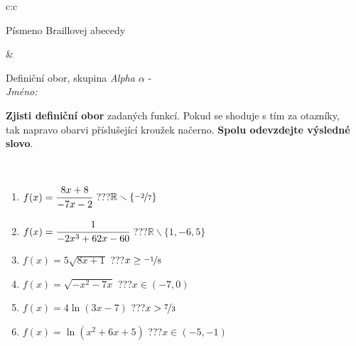 \documentclass[10pt]{report}
\begin{document}
\begin{tabular}{c:c}
\begin{minipage}[c][104.5mm][t]{0.5\linewidth}
\begin{center}
\begin{minipage}{0.20\linewidth}
\begin{center}
{\small Písmeno Braillovej abecedy}
\end{center}
\end{minipage}
\end{center}
\end{minipage}
&
\begin{minipage}[c][104.5mm][t]{0.5\linewidth}
\begin{center}
\vspace{7mm}
{\huge Definiční obor, skupina \textit{Alpha $\alpha$} -}\\[5mm]
\textit{Jméno:}\phantom{xxxxxxxxxxxxxxxxxxxxxxxxxxxxxxxxxxxxxxxxxxxxxxxxxxxxxxxxxxxxxxxxx}\\[5mm]
\begin{minipage}{0.95\linewidth}
\begin{center}
\textbf{Zjisti definiční obor} zadaných funkcí. Pokud se shoduje s tím za otazníky,\\tak napravo obarvi příslušející kroužek načerno. \textbf{Spolu odevzdejte výsledné slovo}.
\end{center}
\end{minipage}
\\[1mm]
\begin{minipage}{0.79\linewidth}
\begin{center}
\begin{varwidth}{\linewidth}
\begin{enumerate}
\normalsizerrr
\item $f(x)=\cfrac{8x+8}{-7x-2}$\quad \dotfill\; ???\;\dotfill \quad $\mathbb{R}\smallsetminus\{\nicefrac{-2}{7}\}$
\item $f(x)=\cfrac{1}{-2x^3+62x-60}$\quad \dotfill\; ???\;\dotfill \quad $\mathbb{R}\smallsetminus\{1,-6,5\}$
\item $f(x)=5\sqrt{8x+1}$\quad \dotfill\; ???\;\dotfill \quad $x\geq\nicefrac{-1}{8}$
\item $f(x)=\sqrt{-x^2-7x}$\quad \dotfill\; ???\;\dotfill \quad $x\in(-7 , 0)$
\item $f(x)=4\ln{(3x-7)}$\quad \dotfill\; ???\;\dotfill \quad $x>\nicefrac{7}{3}$
\item $f(x)=\ln{(x^2+6x+5)}$\quad \dotfill\; ???\;\dotfill \quad $x\in(-5 , -1)$
\end{enumerate}
\end{varwidth}
\end{center}
\end{minipage}
\begin{minipage}{0.20\linewidth}
\begin{center}

\end{center}
\end{minipage}
\end{center}
\end{minipage}
\end{tabular}
\end{document}
